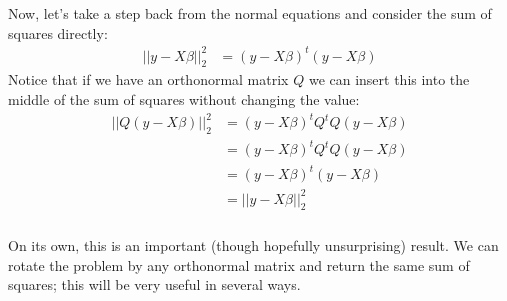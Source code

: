 \begin{frame}[fragile] \frametitle{}

Now, let's take a step back from the normal equations and consider
the sum of squares directly:
\begin{align*}
|| y - X \beta ||_2^2 &= (y - X \beta)^t (y - X\beta)
\end{align*}
\pause Notice that if we have an orthonormal matrix $Q$ we can insert this
into the middle of the sum of squares without changing the value:
\begin{align*}
|| Q (y - X \beta) ||_2^2 &= (y - X \beta)^t Q^t Q (y - X\beta) \\
&= (y - X \beta)^t Q^t Q (y - X\beta) \\
&= (y - X \beta)^t (y - X\beta) \\
&= || y - X \beta ||_2^2
\end{align*}

\end{frame}

\begin{frame}[fragile] \frametitle{}

On its own, this is an important (though hopefully unsurprising)
result. We can rotate the problem by any orthonormal matrix and
return the same sum of squares; this will be very useful in
several ways.

\end{frame}

